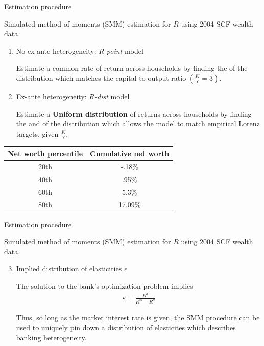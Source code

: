 \documentclass{beamer}
\begin{document}
\begin{frame}{Estimation procedure}


Simulated method of moments (SMM) estimation for $R$ using 2004 SCF wealth data.

  \begin{enumerate}
  \item No ex-ante heterogeneity: $R$\textit{-point} model
  \par Estimate a common rate of return across households by finding the  of the distribution  which matches the capital-to-output ratio $(\frac{K}{Y} = 3)$.
  \vspace{2.5mm}

  \item Ex-ante heterogeneity: $R$\textit{-dist} model
  \par Estimate  a \textbf{Uniform distribution} of returns across households by finding the  and  of the distribution which allows the model to match empirical Lorenz targets, given $\frac{K}{Y}$.
  \end{enumerate}
  
  \centering
  \small
  \begin{tabular}{|c|c|}
\hline
Net worth percentile & Cumulative net worth \\
\hline
20th & -.18\%  \\
40th &  .95\% \\
60th &  5.3\% \\
80th &  17.09\% \\
\hline
\end{tabular}


\end{frame}

\begin{frame}{Estimation procedure}

Simulated method of moments (SMM) estimation for $R$ using 2004 SCF wealth data.

\begin{enumerate}
  \setcounter{enumi}{2} 
\item Implied distribution of elasticities $\epsilon$
  \par The solution to the bank's optimization problem implies
  \begin{align}
    \varepsilon = \frac{R^d}{R^m - R^d}
  \end{align}

  \par Thus, so long as the market interest rate is given, the SMM procedure can be used to uniquely pin down a distribution of elasticites which describes banking heterogeneity.
  \end{enumerate}

\end{frame}
\end{document}
